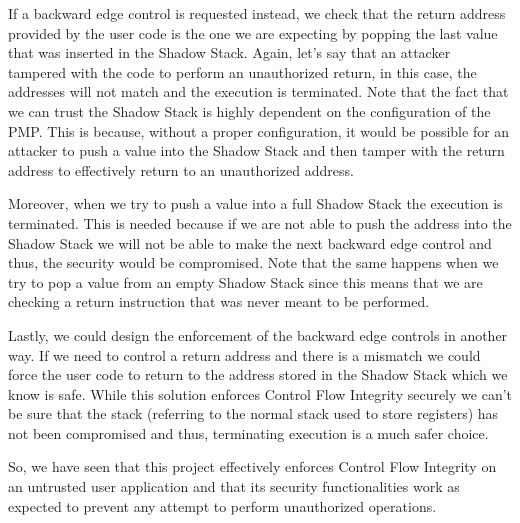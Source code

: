 If a backward edge control is requested instead, we check that the return address
provided by the user code is the one we are expecting by popping the last value that
was inserted in the Shadow Stack. Again, let's say that an attacker tampered with
the code to perform an unauthorized return, in this case, the addresses will not
match and the execution is terminated. Note that the fact that we can trust the
Shadow Stack is highly dependent on the configuration of the PMP. This is because,
without a proper configuration, it would be possible for an attacker to push a value
into the Shadow Stack and then tamper with the return address to effectively return
to an unauthorized address.

Moreover, when we try to push a value into a full Shadow Stack the execution is
terminated. This is needed because if we are not able to push the address into the
Shadow Stack we will not be able to make the next backward edge control and thus,
the security would be compromised. Note that the same happens when we try to pop
a value from an empty Shadow Stack since this means that we are checking a return
instruction that was never meant to be performed.

Lastly, we could design the enforcement of the backward edge controls in another
way. If we need to control a return address and there is a mismatch we could force
the user code to return to the address stored in the Shadow Stack which we know is
safe. While this solution enforces Control Flow Integrity securely we can't be
sure that the stack (referring to the normal stack used to store registers) has
not been compromised and thus, terminating execution is a much safer choice.

So, we have seen that this project effectively enforces Control Flow Integrity
on an untrusted user application and that its security functionalities work as
expected to prevent any attempt to perform unauthorized operations.
